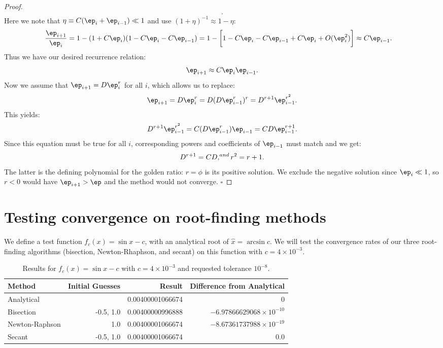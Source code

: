 \documentclass{article}
\begin{document}
\begin{proof}
\begin{align}
{    }.
\end{align}
Here we note that $\eta \equiv C(\ep_i + \ep_{i - 1}) \ll 1$ and
use $(1 + \eta)^{-1} \approx 1 - \eta$:
\begin{align}
    {\ep_{i+1} \over \ep_i} &=
    1 - (1 + C\ep_i)
    (1 - C\ep_i - C\ep_{i-1})
    = 1 - \bigg[1 - C\ep_i - C\ep_{i-1} + C\ep_i + O(\ep_i^2)\bigg]
    \approx C \ep_{i - 1}.
\end{align}
Thus we have our desired recurrence relation:
\begin{align}
    \ep_{i + 1} \approx C \ep_i \ep_{i - 1}.
\end{align}
Now we assume that $\ep_{i + 1} = D \ep_i^r$ for all $i$, which
allows us to replace:
\begin{align}
    \ep_{i + 1} = D \ep_i^r = D (D \ep_{i - 1}^r)^r =
    D^{r + 1} \ep_{i - 1}^{r^2}.
\end{align}
This yields:
\begin{align}
    D^{r + 1} \ep_{i - 1}^{r^2}
    = C (D \ep_{i-1}^r)\ep_{i - 1}
    = CD \ep_{i-1}^{r + 1}.
\end{align}
Since this equation must be true for all $i$, corresponding
powers and coefficients of $\ep_{i-1}$ must match and we get:
\begin{align}
    D^{r + 1} = CD,
    \sp{and} r^2 = r + 1.
\end{align}
The latter is the defining polynomial for the golden ratio:
$r = \phi$ is its positive solution. We exclude the negative solution
since $\ep_i \ll 1$, so $r < 0$ would have $\ep_{i+1} > \ep$ and
the method would not converge. $\square$
\end{proof}

\section{Testing convergence on root-finding methods}

We define a test function $f_c(x) = \sin x - c$,
with an analytical root of $\hat x = \arcsin c$. We will test the convergence
rates of our three root-finding algorithms (bisection, Newton-Rhaphson,
and secant) on this function with $c = 4 \times 10^{-3}$.

\begin{table}[ht!]\centering
    \begin{tabular}{l | r | r | r}
        \textbf{Method} & Initial Guesses & Result & Difference
        from Analytical\\\hline
        Analytical & & 0.00400001066674 & 0 \\
        Bisection & -0.5, 1.0& 0.00400000996888
        & $-6.97866629068 \times 10^{-10}$ \\
        Newton-Raphson & 1.0 & 0.00400001066674
        & $-8.67361737988 \times 10^{-19}$\\
        Secant & -0.5, 1.0 & 0.00400001066674 & 0.0
    \end{tabular}
    \label{results}
    \caption{Results for $f_c(x) = \sin x - c$
    with $c = 4 \times 10^{-3}$ and requested
    tolerance $10^{-8}.$}
\end{table}
\end{document}
